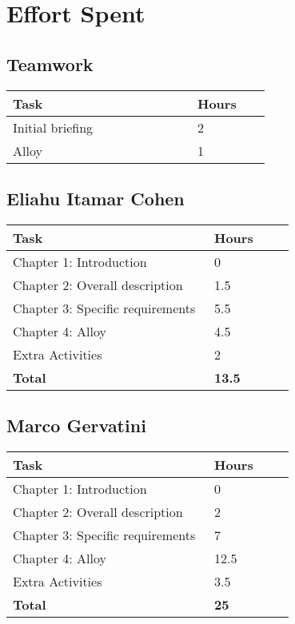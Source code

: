 \chapter{Effort Spent}

\section{Teamwork}
\begin{center}
    \begin{tabular}{@{}p{0.5\linewidth} p{0.2\linewidth}@{}}
        \hline
        \textbf{Task} & \textbf{Hours} \\ \hline
        Initial briefing & 2 \\ \hline
        Alloy & 1 \\ \hline
    \end{tabular}
\end{center}

\section{Eliahu Itamar Cohen}
\begin{center}
    \begin{tabular}{@{}p{0.5\linewidth} p{0.2\linewidth}@{}}
        \hline
        \textbf{Task} & \textbf{Hours} \\ \hline
        Chapter 1: Introduction & 0 \\ \hline
        Chapter 2: Overall description & 1.5 \\ \hline
        Chapter 3: Specific requirements & 5.5 \\ \hline
        Chapter 4: Alloy & 4.5 \\ \hline
        Extra Activities & 2 \\ \hline
        \hline
        \textbf{Total} & \textbf{13.5} \\\hline
    \end{tabular}
\end{center}

\section{Marco Gervatini}
\begin{center}
	\begin{tabular}{@{}p{0.5\linewidth} p{0.2\linewidth}@{}}
		\hline
		\textbf{Task} & \textbf{Hours} \\ \hline
            Chapter 1: Introduction & 0 \\ \hline
            Chapter 2: Overall description & 2 \\ \hline
            Chapter 3: Specific requirements & 7 \\ \hline
            Chapter 4: Alloy & 12.5 \\ \hline
            Extra Activities & 3.5 \\ \hline
            \hline
            \textbf{Total} & \textbf{25} \\\hline
	\end{tabular}
\end{center}

